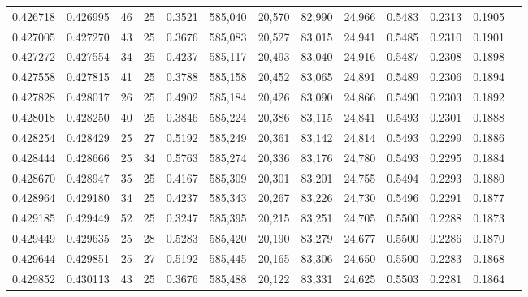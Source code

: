 \begin{tabular}{rrrrrrrrrrrrr}
0.426718 & 0.426995 &    46 &  25 &                                     0.3521 & 585,040 &  20,570 &  82,990 &  24,966 & 0.5483 & 0.2313 & 0.1905 \\
0.427005 & 0.427270 &    43 &  25 &                                     0.3676 & 585,083 &  20,527 &  83,015 &  24,941 & 0.5485 & 0.2310 & 0.1901 \\
0.427272 & 0.427554 &    34 &  25 &                                     0.4237 & 585,117 &  20,493 &  83,040 &  24,916 & 0.5487 & 0.2308 & 0.1898 \\
0.427558 & 0.427815 &    41 &  25 &                                     0.3788 & 585,158 &  20,452 &  83,065 &  24,891 & 0.5489 & 0.2306 & 0.1894 \\
0.427828 & 0.428017 &    26 &  25 &                                     0.4902 & 585,184 &  20,426 &  83,090 &  24,866 & 0.5490 & 0.2303 & 0.1892 \\
0.428018 & 0.428250 &    40 &  25 &                                     0.3846 & 585,224 &  20,386 &  83,115 &  24,841 & 0.5493 & 0.2301 & 0.1888 \\
0.428254 & 0.428429 &    25 &  27 &                                     0.5192 & 585,249 &  20,361 &  83,142 &  24,814 & 0.5493 & 0.2299 & 0.1886 \\
0.428444 & 0.428666 &    25 &  34 &                                     0.5763 & 585,274 &  20,336 &  83,176 &  24,780 & 0.5493 & 0.2295 & 0.1884 \\
0.428670 & 0.428947 &    35 &  25 &                                     0.4167 & 585,309 &  20,301 &  83,201 &  24,755 & 0.5494 & 0.2293 & 0.1880 \\
0.428964 & 0.429180 &    34 &  25 &                                     0.4237 & 585,343 &  20,267 &  83,226 &  24,730 & 0.5496 & 0.2291 & 0.1877 \\
0.429185 & 0.429449 &    52 &  25 &                                     0.3247 & 585,395 &  20,215 &  83,251 &  24,705 & 0.5500 & 0.2288 & 0.1873 \\
0.429449 & 0.429635 &    25 &  28 &                                     0.5283 & 585,420 &  20,190 &  83,279 &  24,677 & 0.5500 & 0.2286 & 0.1870 \\
0.429644 & 0.429851 &    25 &  27 &                                     0.5192 & 585,445 &  20,165 &  83,306 &  24,650 & 0.5500 & 0.2283 & 0.1868 \\
0.429852 & 0.430113 &    43 &  25 &                                     0.3676 & 585,488 &  20,122 &  83,331 &  24,625 & 0.5503 & 0.2281 & 0.1864 \\

\end{tabular}

